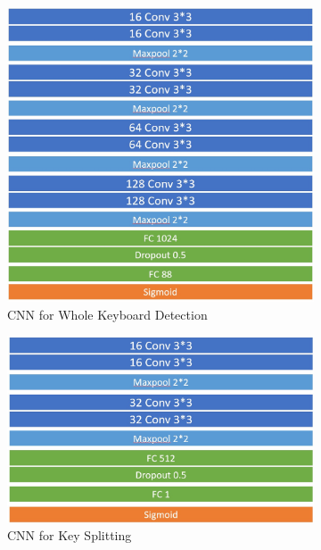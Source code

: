 \documentclass[10pt,twocolumn,letterpaper]{article}
\begin{document}
   \begin{figure}[h!]
      \centering
      \begin{subfigure}{0.4\textwidth}
         \includegraphics[width=\linewidth]{fig/10.png}
         \caption{CNN for Whole Keyboard Detection} \label{fig:h}
       \end{subfigure}
       \begin{subfigure}{0.4\textwidth}
         \includegraphics[width=\linewidth]{fig/11.png}
         \caption{CNN for Key Splitting} \label{fig:i}
       \end{subfigure}
       \begin{subfigure}{0.4\textwidth}

\end{subfigure}
\end{figure}
\end{document}
